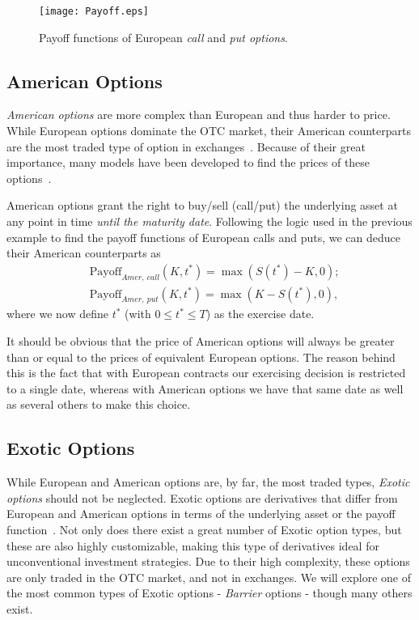\begin{figure}[!htb]
    \centering
      \texttt{[image: Payoff.eps]}
      \caption[Payoff functions of European call and put options]{Payoff functions of European \emph{call} and \emph{put options}.}\label{fig:Payoff}
    \end{figure}
    



\subsection{American Options}
\emph{American options} are more complex than European and thus harder to price. While European options dominate the OTC market, their American counterparts are the most traded type of option in exchanges~\citep{InvAmer}. Because of their great importance, many models have been developed to find the prices of these options~\citep{Longstaff}.

American options grant the right to buy/sell (call/put) the underlying asset at any point in time \emph{until the maturity date}. Following the logic used in the previous example to find the payoff functions of European calls and puts, we can deduce their American counterparts as
\begin{subequations}
\begin{align}
&\text{Payoff}_{Amer,\ call}(K,t^*)=\max\left(S(t^*)-K,0\right);\\
&\text{Payoff}_{Amer,\ put}(K,t^*)=\max\left(K-S(t^*),0\right),
\end{align}
\end{subequations}
\noindent where we now define $t^*$ (with $0\leq t^*\leq T$) as the exercise date.

It should be obvious that the price of American options will always be greater than or equal to the prices of equivalent European options. The reason behind this is the fact that with European contracts our exercising decision is restricted to a single date, whereas with American options we have that same date as well as several others to make this choice.


\subsection{Exotic Options}
While European and American options are, by far, the most traded types, \emph{Exotic options} should not be neglected. Exotic options are derivatives that differ from European and American options in terms of the underlying asset or the payoff function~\citep{InvExotic}.
Not only does there exist a great number of Exotic option types, but these are also highly customizable, making this type of derivatives ideal for unconventional investment strategies. Due to their high complexity, these options are only traded in the OTC market, and not in exchanges. We will explore one of the most common types of Exotic options - \emph{Barrier} options - though many others exist.


